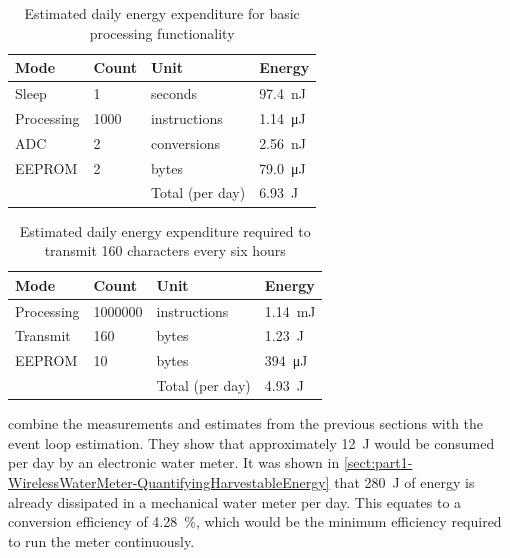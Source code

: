     \begin{table}
      \centering
      \begin{tabular}{|l|l|l|l|}
        \hline
        Mode & Count & Unit & Energy \\ \hline
        Sleep & 1 & seconds & \SI{97.4}{\nano\joule} \\
        Processing & 1000 & instructions & \SI{1.14}{\micro\joule} \\
        ADC & 2 & conversions & \SI{2.56}{\nano\joule} \\
        EEPROM & 2 & bytes & \SI{79.0}{\micro\joule} \\ \hline \hline
        &&Total (per day) & \SI{6.93}{\joule} \\ \hline
      \end{tabular}
      \caption{\label{tab:EnergyBudget-EventLoop} Estimated daily energy expenditure for basic processing functionality}
    \end{table}

    \begin{table}
      \centering
      \begin{tabular}{|l|l|l|l|}
        \hline
        Mode & Count & Unit & Energy \\ \hline
        Processing & 1000000 & instructions & \SI{1.14}{\milli\joule} \\
        Transmit & 160 & bytes & \SI{1.23}{\joule} \\
        EEPROM & 10 & bytes & \SI{394}{\micro\joule} \\ \hline \hline
        &&Total (per day) & \SI{4.93}{\joule} \\ \hline
      \end{tabular}
      \caption{\label{tab:EnergyBudget-Transmission}Estimated daily energy expenditure required to transmit 160 characters every six hours}
    \end{table}

     combine the measurements and estimates from the previous sections with the event loop estimation.
    They show that approximately \SI{12}{\joule} would be consumed per day by an electronic water meter.
    It was shown in \cref{sect:part1-WirelessWaterMeter-QuantifyingHarvestableEnergy} that \SI{280}{\joule} of energy is already dissipated in a mechanical water meter per day.
    This equates to a conversion efficiency of \SI{4.28}{\percent}, which would be the minimum efficiency required to run the meter continuously.

